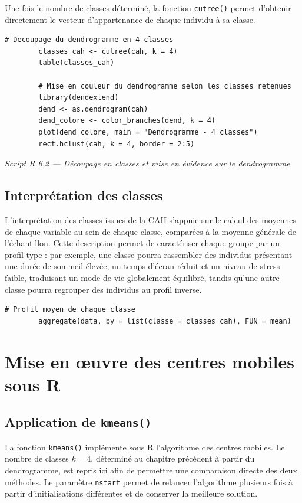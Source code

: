 \documentclass[11pt,a4paper]{report}
\newcommand{\rcaption}[1]{%
	\begin{center}\small\itshape\color{grey} #1\end{center}\vspace{4pt}
}
\begin{document}
	Une fois le nombre de classes déterminé, la fonction \texttt{cutree()} permet d'obtenir directement le vecteur d'appartenance de chaque individu à sa classe.
	
	\begin{lstlisting}[style=rstyle]
		# Decoupage du dendrogramme en 4 classes
		classes_cah <- cutree(cah, k = 4)
		table(classes_cah)
		
		# Mise en couleur du dendrogramme selon les classes retenues
		library(dendextend)
		dend <- as.dendrogram(cah)
		dend_colore <- color_branches(dend, k = 4)
		plot(dend_colore, main = "Dendrogramme - 4 classes")
		rect.hclust(cah, k = 4, border = 2:5)
	\end{lstlisting}
	\rcaption{Script R 6.2 --- Découpage en classes et mise en évidence sur le dendrogramme}
	
	\section{Interprétation des classes}
	
	L'interprétation des classes issues de la CAH s'appuie sur le calcul des moyennes de chaque variable au sein de chaque classe, comparées à la moyenne générale de l'échantillon. Cette description permet de caractériser chaque groupe par un profil-type : par exemple, une classe pourra rassembler des individus présentant une durée de sommeil élevée, un temps d'écran réduit et un niveau de stress faible, traduisant un mode de vie globalement équilibré, tandis qu'une autre classe pourra regrouper des individus au profil inverse.
	
	\begin{lstlisting}[style=rstyle]
		# Profil moyen de chaque classe
		aggregate(data, by = list(classe = classes_cah), FUN = mean)
	\end{lstlisting}
	
	\chapter{Mise en œuvre des centres mobiles sous R}
	
	\section{Application de \texttt{kmeans()}}
	
	La fonction \texttt{kmeans()} implémente sous R l'algorithme des centres mobiles. Le nombre de classes $k = 4$, déterminé au chapitre précédent à partir du dendrogramme, est repris ici afin de permettre une comparaison directe des deux méthodes. Le paramètre \texttt{nstart} permet de relancer l'algorithme plusieurs fois à partir d'initialisations différentes et de conserver la meilleure solution.
	
\end{document}

